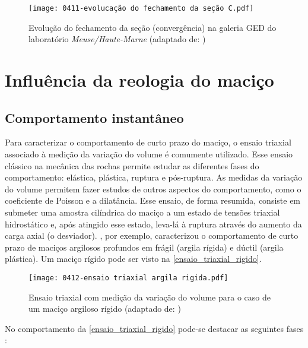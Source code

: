 \begin{figure}[H]
	\begin{center}
		\texttt{[image: 0411-evolucação do fechamento da seção C.pdf]}
	\end{center}
	\caption{\label{evolucao_GED}Evolução do fechamento da seção (convergência) na galeria GED do laboratório \textit{Meuse/Haute-Marne}  (adaptado de: )}
\end{figure}



\section{Influência da reologia do maciço}

\subsection{Comportamento instantâneo}\label{comportamento_instantaneo}

Para caracterizar o comportamento de curto prazo do maciço, o ensaio triaxial associado à medição da variação do volume é comumente utilizado. Esse ensaio clássico na mecânica das rochas permite estudar as diferentes fases do comportamento: elástica, plástica, ruptura e pós-ruptura. As medidas da variação do volume permitem fazer estudos de outros aspectos do comportamento, como o coeficiente de Poisson e a dilatância. Esse ensaio, de forma resumida, consiste em submeter uma amostra cilíndrica do maciço a um estado de tensões triaxial hidrostático e, após atingido esse estado, leva-lá à ruptura através do aumento da carga axial (o desviador). , por exemplo, caracterizou o comportamento de curto prazo de maciços argilosos profundos em frágil (argila rígida) e dúctil (argila plástica). Um maciço rígido pode ser visto na \autoref{ensaio_triaxial_rigido}.

\begin{figure}[H]
	\begin{center}
		\texttt{[image: 0412-ensaio triaxial argila rigida.pdf]}
	\end{center}
	\caption{\label{ensaio_triaxial_rigido}Ensaio triaxial com medição da variação do volume para o caso de um maciço argiloso rígido (adaptado de: )}
\end{figure}

No comportamento da \autoref{ensaio_triaxial_rigido} pode-se destacar as seguintes fases \cite[p. 34]{Rousset1988}:

